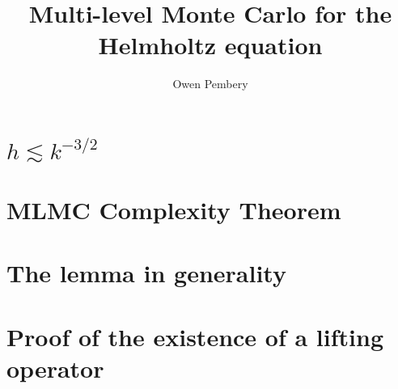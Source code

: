 \documentclass[12pt]{article}
\title{Multi-level Monte Carlo for the Helmholtz equation}
\author{Owen Pembery}
\begin{document}
\maketitle

%
%

\section{$h \lesssim k^{-3/2}$} %






\section{MLMC Complexity Theorem}\label{sec:comp}






%
%

\section{The lemma in generality}



%
%
%
%
%

\appendix

\section{Proof of the existence of a lifting operator} %
\label{app:ud}

%



\end{document}
